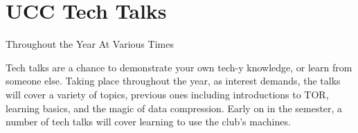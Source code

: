 \section{UCC Tech Talks}
Throughout the Year
At Various Times

Tech talks are a chance to demonstrate your own tech-y knowledge, or learn from someone else. Taking place throughout the year, as interest demands, the talks will cover a variety of topics, previous ones including introductions to TOR, learning basics, and the magic of data compression. Early on in the semester, a number of tech talks will cover learning to use the club's machines.
